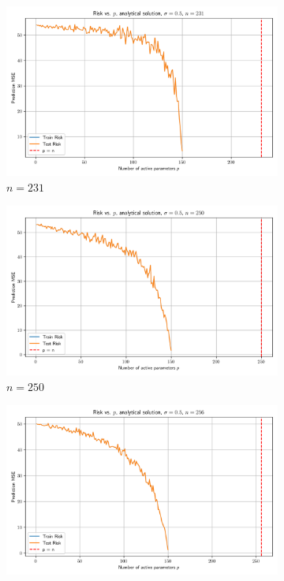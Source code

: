 \documentclass{article}
\begin{document}
\begin{figure}[htb]
  \begin{subfigure}[b]{\imgwidth}
    \includegraphics[width=\linewidth]{img2/risk_curve_n231.png}
    \caption{$n=231$}\label{fig:2m}
  \end{subfigure}%
  \hfill
  \begin{subfigure}[b]{\imgwidth}
    \includegraphics[width=\linewidth]{img2/risk_curve_n250.png}
    \caption{$n=250$}\label{fig:2n}
  \end{subfigure}%
  \hfill
  \begin{subfigure}[b]{\imgwidth}
    \includegraphics[width=\linewidth]{img2/risk_curve_n256.png}

\end{subfigure}
\end{figure}
\end{document}
